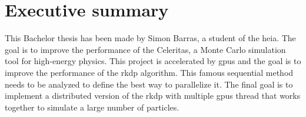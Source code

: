 \chapter{Executive summary}
\label{ch:report-executive-summary}

This Bachelor thesis has been made by Simon Barras, a student of the \acrlong{heia}.
The goal is to improve the performance of the Celeritas, a Monte Carlo simulation
tool for high-energy physics.
This project is accelerated by \acrshort{gpu}s and the goal is to improve the
performance of the \acrshort{rkdp} algorithm.
This famous sequential method needs to be analyzed to define the best way to
parallelize it.
The final goal is to implement a distributed version of the \acrshort{rkdp}
with multiple \acrshort{gpu}s thread that works together to simulate a large
number of particles.
